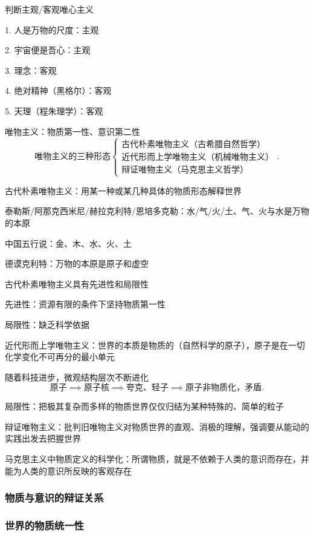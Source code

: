 \begin{eg}
    判断主观/客观唯心主义

    1. 人是万物的尺度：主观

    2. 宇宙便是吾心：主观

    3. 理念：客观

    4. 绝对精神（黑格尔）：客观

    5. 天理（程朱理学）：客观
\end{eg}
唯物主义：物质第一性、意识第二性
\[
    \text{唯物主义的三种形态}
    \begin{cases}
        \text{古代朴素唯物主义（古希腊自然哲学）}\\ 
        \text{近代形而上学唯物主义（机械唯物主义）}\\ 
        \text{辩证唯物主义（马克思主义哲学）}
    \end{cases}
.\] 
\begin{notation}
    古代朴素唯物主义：用某一种或某几种具体的物质形态解释世界

    泰勒斯/阿那克西米尼/赫拉克利特/恩培多克勒：水/气/火/土、气、火与水是万物的本原

    中国五行说：金、木、水、火、土

    德谟克利特：万物的本原是原子和虚空
\end{notation}

古代朴素唯物主义具有先进性和局限性

先进性：资源有限的条件下坚持物质第一性

局限性：缺乏科学依据
\begin{notation}
    近代形而上学唯物主义：世界的本质是物质的（自然科学的原子），原子是在一切化学变化不可再分的最小单元

    随着科技进步，微观结构层次不断进化
    \[
        \text{原子}\implies\text{原子核}\implies\text{夸克、轻子}\implies\text{原子非物质化，矛盾}
    .\]

    局限性：把极其复杂而多样的物质世界仅仅归结为某种特殊的、简单的粒子
\end{notation}
\begin{notation}
    辩证唯物主义：批判旧唯物主义对物质世界的直观、消极的理解，强调要从能动的实践出发去把握世界

    马克思主义中物质定义的科学化：所谓物质，就是不依赖于人类的意识而存在，并能为人类的意识所反映的客观存在
\end{notation}



\subsubsection*{物质与意识的辩证关系}%
\label{subsub:物质与意识的辩证关系}


\subsubsection*{世界的物质统一性}%
\label{subsub:世界的物质统一性}

